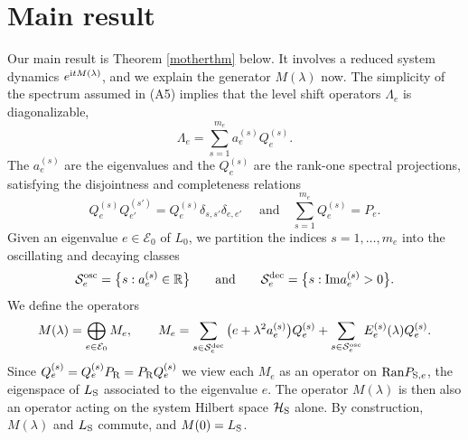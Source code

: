 \documentclass[letterpaper,onecolumn,11pt,accepted=2021-12-09]{quantumarticle}
\numberwithin{equation}{section}
\newcommand{\aes}{a_e^{(s)}}
\newcommand{\Qes}{Q_e^{(s)}}
\newcommand{\Ees}{E_e^{(s)}(\lambda)}
\renewcommand{\r}{{\rm R}}
\newcommand{\s}{{\rm S}}
\renewcommand{\i}{{\rm i}}
\begin{document}
\section{Main result}


Our main result is Theorem \ref{motherthm} below. It involves a reduced system dynamics $e^{\i t M(\lambda)}$, and we explain the generator $M(\lambda)$ now. The simplicity of the spectrum assumed in (A5) implies that the level shift operators $\Lambda_e$ is diagonalizable, 
\begin{equation}
	\label{83}
	\Lambda_e = \sum_{s=1}^{m_e} \aes \Qes.
\end{equation}
The $\aes$ are the eigenvalues and the $\Qes$ are the rank-one spectral projections, satisfying the disjointness and completeness relations
$$
Q_e^{(s)}Q_{e'}^{(s')}=Q_e^{(s)}\delta_{s,s'}\delta_{e,e'}\quad \mbox{ 
and}\quad  \sum_{s=1}^{m_e} Q_e^{(s)}=P_e. 
$$
Given an eigenvalue $e\in{\mathcal E}_0$ of $L_0$, we partition the indices $s=1,\ldots,m_e$ into the oscillating and decaying classes
\begin{equation}
{\mathcal S}_e^{\rm osc} = \big\{ s : \aes\in{\mathbb R} \big\}\qquad \mbox{and}\qquad {\mathcal S}_e^{\rm dec} = \big\{ s : {\rm Im} \aes>0\big\}.
\label{27}
\end{equation}
We define the operators
\begin{equation}
	M(\lambda) = \bigoplus_{e\in{\mathcal E}_0} M_e,\qquad M_e = \sum_{s\in{\mathcal S}_e^{\rm dec}} \big(e+\lambda^2\aes\big) \Qes + \sum_{s\in{\mathcal S}^{\rm osc}_e} \Ees \Qes.
	\label{M}
\end{equation}
Since $Q_e^{(s)}=Q_e^{(s)}P_\r=P_\r Q_e^{(s)}$ we view each $M_e$ as an operator on ${\rm Ran}P_{\s,e}$, the eigenspace of $L_\s$ associated to the eigenvalue $e$. The operator $M(\lambda)$ is then also an operator acting on the system Hilbert space ${\mathcal H}_\s$ alone.  By construction, $M(\lambda)$ and $L_\s$ commute, and $M(0)=L_\s$. 
\medskip
\end{document}
